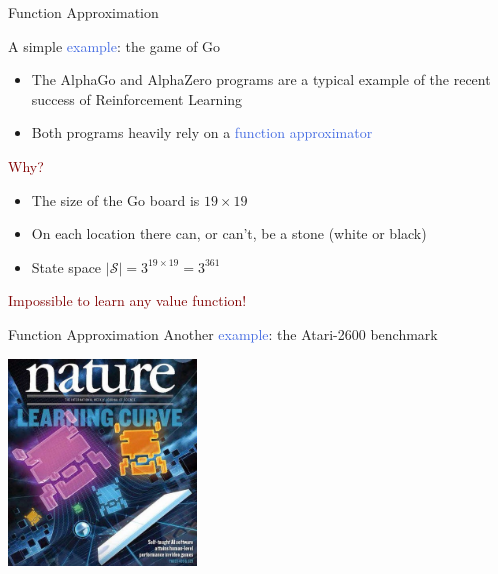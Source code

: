 \documentclass{beamer}
\begin{document}
\begin{frame}{Function Approximation}

	A simple \textcolor{RoyalBlue}{example}: the game of Go
	
	\begin{itemize}
		\item The AlphaGo and AlphaZero programs are a typical example of the recent success of Reinforcement Learning
		\item Both programs heavily rely on a \textcolor{RoyalBlue}{function approximator}
	\end{itemize}
	
	\bigskip

	\textcolor{Maroon}{Why?}

	\begin{itemize}
		\item The size of the Go board is $19\times19$
		\item On each location there can, or can't, be a stone (white or black)
		\item State space $|\mathcal{S}| = 3^{19\times19}=3^{361}$
	\end{itemize}

	\bigskip
	
	\centering
	\textcolor{Maroon}{Impossible to learn any value function!}

\end{frame}

\begin{frame}{Function Approximation}
	Another \textcolor{RoyalBlue}{example}: the Atari-2600 benchmark
	\bigskip

	\begin{center}
		\includegraphics[width=5cm]{./Images/nature}
	\end{center}

\end{frame}
\end{document}
